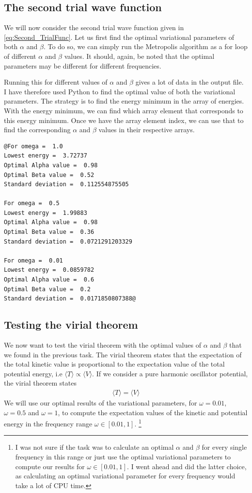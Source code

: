 \documentclass[12pt]{article}
\begin{document}
  
\FloatBarrier
\subsection{The second trial wave function}
We will now consider the second trial wave function given in  \ref{eq:Second_TrialFunc}. Let us first find the optimal variational parameters of both $\alpha$ and $\beta$. To do so, we can simply run the Metropolis algorithm as a for loop of different $\alpha$ and $\beta$ values. It should, again, be noted that the optimal parameters may be different for different frequencies.

Running this for different values of $\alpha$ and $\beta$ gives a lot of data in the output file. I have therefore used Python to find the optimal value of both the variational parameters. The strategy is to find the energy minimum in the array of energies. With the energy minimum, we can find which array element that corresponds to this energy minimum. Once we have the array element index, we can use that to find the corresponding $\alpha$ and $\beta$ values in their respective arrays.

\begin{lstlisting}
@For omega =  1.0
Lowest energy =  3.72737
Optimal Alpha value =  0.98
Optimal Beta value =  0.52
Standard deviation =  0.112554875505

For omega =  0.5
Lowest energy =  1.99883
Optimal Alpha value =  0.98
Optimal Beta value =  0.36
Standard deviation =  0.0721291203329

For omega =  0.01
Lowest energy =  0.0859782
Optimal Alpha value =  0.6
Optimal Beta value =  0.2
Standard deviation =  0.0171850807388@
\end{lstlisting}
\FloatBarrier

\subsection{Testing the virial theorem}
We now want to test the virial theorem with the optimal values of $\alpha$ and $\beta$ that we found in the previous  task. The virial theorem states that the expectation of the total kinetic value is proportional to the expectation value of the total potential energy, i.e $\langle T \rangle \propto \langle V \rangle$. If we consider a pure harmonic oscillator potential, the virial theorem states
\begin{align*}
\langle T \rangle = \langle V \rangle
\end{align*}
We will use our optimal results of the variational parameters, for $\omega = 0.01$, $\omega = 0.5$ and $\omega=1$, to compute the expectation values of the kinetic and potential energy in the frequency range $\omega \in [0.01, 1]$. \footnote{I was not sure if the task was to calculate an optimal $\alpha$ and $\beta$ for every single frequency in this range or just use the optimal variational parameters to compute our results for $\omega \in [0.01, 1]$. I went ahead and did the latter choice, as calculating an optimal variational parameter for every frequency would take a lot of CPU time.}
\end{document}
